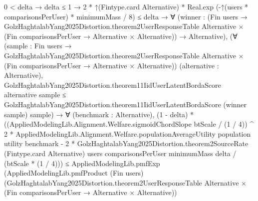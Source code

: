 \documentclass[10pt]{article}
\begin{document}
\begin{ReviewVerbatim}
                          0 < delta →
                            delta ≤ 1 →
                              2 * ↑(Fintype.card Alternative) *
                                    Real.exp (-↑(users * comparisonsPerUser) * minimumMass / 8) ≤
                                  delta →
                                ∀
                                  (winner :
                                    (Fin users →
                                        GolzHaghtalabYang2025Distortion.theorem2UserResponseTable Alternative ×
                                          (Fin comparisonsPerUser → Alternative × Alternative)) →
                                      Alternative),
                                  (∀
                                      (sample :
                                        Fin users →
                                          GolzHaghtalabYang2025Distortion.theorem2UserResponseTable Alternative ×
                                            (Fin comparisonsPerUser → Alternative × Alternative))
                                      (alternative : Alternative),
                                      GolzHaghtalabYang2025Distortion.theorem11IidUserLatentBordaScore alternative
                                          sample ≤
                                        GolzHaghtalabYang2025Distortion.theorem11IidUserLatentBordaScore (winner sample)
                                          sample) →
                                    ∀ (benchmark : Alternative),
                                      (1 - delta) *
                                          ((AppliedModelingLib.Alignment.Welfare.sigmoidChordSlope btScale / (1 / 4)) ^
                                                2 *
                                              AppliedModelingLib.Alignment.Welfare.populationAverageUtility population
                                                utility benchmark -
                                            2 *
                                                GolzHaghtalabYang2025Distortion.theorem2SourceRate
                                                  (Fintype.card Alternative) users comparisonsPerUser minimumMass
                                                  delta /
                                              (btScale * (1 / 4))) ≤
                                        AppliedModelingLib.pmfExp
                                          (AppliedModelingLib.pmfProduct (Fin users)
                                            (GolzHaghtalabYang2025Distortion.theorem2UserResponseTable Alternative ×
                                              (Fin comparisonsPerUser → Alternative × Alternative))

\end{ReviewVerbatim}
\end{document}
